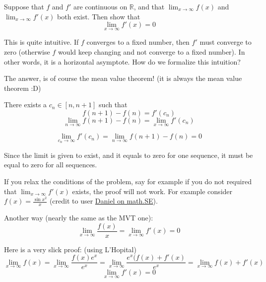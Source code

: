 \documentclass[11]{article}
\title{\sc{Proof of Cauchy-Schwarz by Brute Force}}
\author{\sc{Rahul}}
\date{13 March, 2025}
\begin{document}
\maketitle

Suppose that $f$ and $f'$ are continuous on $\mathbb{R}$, and that $\displaystyle\lim_{x\to\infty}f(x)$ and $\displaystyle\lim_{x\to\infty}f'(x)$ both exist. Then show that $$\displaystyle\lim_{x\to\infty}f'(x) = 0$$


This is quite intuitive. If $f$ converges to a fixed number, then $f'$ must converge to zero (otherwise $f$ would keep changing and not converge to a fixed number). In other words, it is a horizontal asymptote. How do we formalize this intuition?

The answer, is of course the mean value theorem! (it is always the mean value theorem :D)

There exists a $c_n \in [n, n+1]$ such that
$$f(n+1) - f(n) = f'(c_n)$$
$$\lim_{n\to\infty} f(n+1) - f(n)= \lim_{x\to\infty} f'(c_n)$$

$$\lim_{c_n\to\infty} f'(c_n) = \lim_{n\to\infty} f(n+1) - f(n) = 0$$

Since the limit is given to exist, and it equals to zero for one sequence, it must be equal to zero for all sequences.

If you relax the conditions of the problem, say for example if you do not required that $\displaystyle\lim_{x\to\infty}f'(x)$ exists, the proof will not work. For example consider $f(x) = \frac{\sin x^2}{x}$ (credit to user \href{https://math.stackexchange.com/questions/42277/proving-that-lim-limits-x-to-inftyfx-0-when-lim-limits-x-to-inftyf/42298#comment5425701_42277}{Daniel on math.SE}).

Another way (nearly the same as the MVT one):
$$\lim_{x\to\infty}\frac{f(x)}{x} = \lim_{x\to\infty}f'(x) = 0$$

Here is a very slick proof: (using L'Hopital)
$$\lim_{x\to\infty}f(x) = \lim_{x\to\infty}\frac{f(x)e^x}{e^x} = \lim_{x\to\infty}\frac{e^x(f(x) + f'(x)}{e^x} = \lim_{x\to\infty} f(x) + f'(x)$$
$$\lim_{x\to\infty} f'(x) = 0$$
\end{document}

